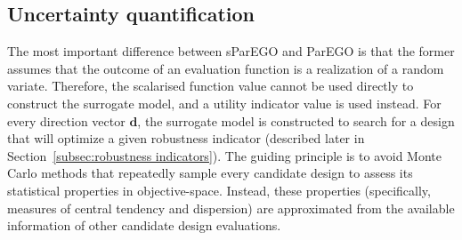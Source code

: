 \documentclass[10pt]{llncs}
\newcommand{\vd}{\mathbf{d}} %
\begin{document}
\subsection{Uncertainty quantification}
\label{subsec:Uncertainty quantification}
The most important difference between sParEGO and ParEGO is that the former assumes that the outcome of an evaluation function is a realization of a random variate.
Therefore, the scalarised function value cannot be used directly to construct the surrogate model, and a utility indicator value is used instead.
For every direction vector $\vd$, the surrogate model is constructed to search for a design that will optimize a given robustness indicator (described later in Section~\ref{subsec:robustness indicators}).
The guiding principle is to avoid Monte Carlo methods that repeatedly sample every candidate design to assess its statistical properties in objective-space.
Instead, these properties (specifically, measures of central tendency and dispersion) are approximated from the available information of other candidate design evaluations.
\end{document}
